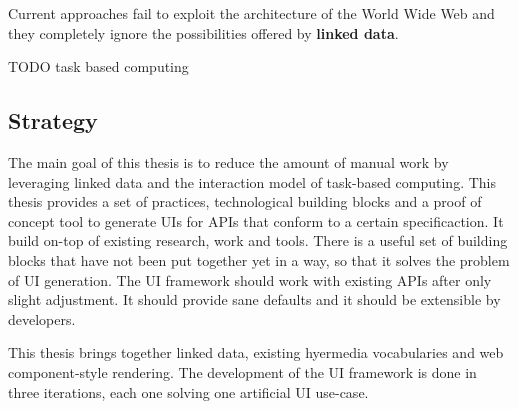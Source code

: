 Current approaches fail to exploit the architecture of the World Wide Web and they completely ignore the possibilities offered by \textbf{linked data}.

TODO task based computing

\subsection{Strategy}\label{strategy}
The main goal of this thesis is to reduce the amount of manual work by leveraging linked data and the interaction model of task-based computing.
This thesis provides a set of practices, technological building blocks and a proof of concept tool to generate UIs for APIs that conform to a certain specificaction. It build on-top of existing research, work and tools. There is a useful set of building blocks that have not been put together yet in a way, so that it solves the problem of UI generation. The UI framework should work with existing APIs after only slight adjustment. It should provide sane defaults and it should be extensible by developers.

This thesis brings together linked data, existing hyermedia vocabularies and web component-style rendering. The development of the UI framework is done in three iterations, each one solving one artificial UI use-case.
